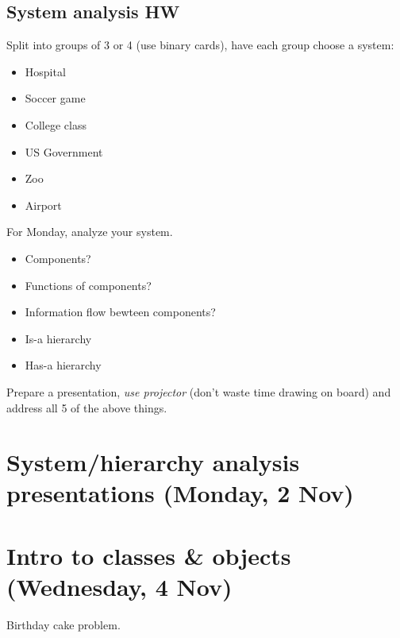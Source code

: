 \documentclass{article}
\begin{document}
\subsection*{System analysis HW}

Split into groups of 3 or 4 (use binary cards), have each group choose
a system:

\begin{itemize}
\item Hospital
\item Soccer game
\item College class
\item US Government
\item Zoo
\item Airport
\end{itemize}

For Monday, analyze your system.
\begin{itemize}
\item Components?
\item Functions of components?
\item Information flow bewteen components?
\item Is-a hierarchy
\item Has-a hierarchy
\end{itemize}

Prepare a presentation, \emph{use projector} (don't waste time drawing
on board) and address all 5 of the above things.

\section*{System/hierarchy analysis presentations (Monday, 2 Nov)}

\section*{Intro to classes \& objects (Wednesday, 4 Nov)}

Birthday cake problem.
\end{document}
